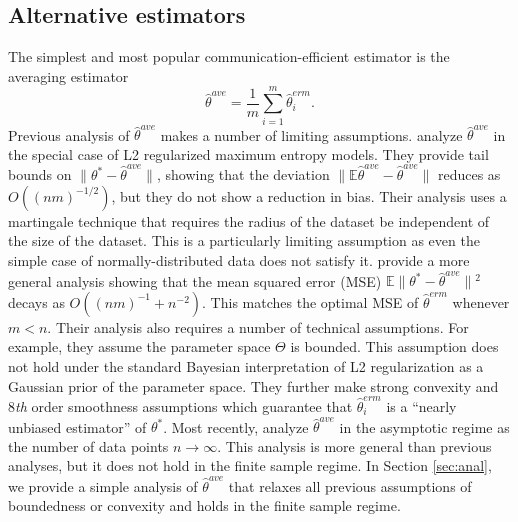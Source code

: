 \documentclass[twoside]{article}
\newcommand{\E}{\mathbb{E}}
\newcommand{\w}{\theta}
\newcommand{\wave}{\hat\w^{ave}}
\newcommand{\wmle}{\hat\w^{erm}}
\newcommand{\wstar}{{\w^{*}}}
\newcommand{\ltwo}[1]{{\lVert {#1} \rVert}}
\begin{document}
\subsection{Alternative estimators}
\label{sec:alt}
The simplest and most popular communication-efficient estimator is the averaging estimator
\begin{equation}
\wave = \frac{1}{m}\sum_{i=1}^m \wmle_i
.
\end{equation}
Previous analysis of $\wave$ makes a number of limiting assumptions.
\citet{mcdonald2009efficient} analyze $\wave$ in the special case of L2 regularized maximum entropy models.
They provide tail bounds on $\ltwo{\wstar-\wave}$, 
showing that the deviation $\ltwo{\E\wave-\wave}$ reduces as $O((nm)^{-1/2})$,
but they do not show a reduction in bias.
Their analysis uses a martingale technique that requires the radius of the dataset be independent of the size of the dataset.
This is a particularly limiting assumption as even the simple case of
normally-distributed data does not satisfy it.
\citet{zhang2012communication} provide a more general analysis showing that the mean squared error (MSE) $\E\ltwo{\wstar-\wave}{}^2$ decays as $O((nm)^{-1} + n^{-2})$.
This matches the optimal MSE of $\wmle$ whenever $m<n$.
Their analysis also requires a number of technical assumptions.
For example, they assume the parameter space $\Theta$ is bounded.
This assumption does not hold under the standard Bayesian interpretation of L2 regularization as a Gaussian prior of the parameter space.
They further make strong convexity and 8\emph{th} order smoothness assumptions which guarantee that $\wmle_i$ is a ``nearly unbiased estimator'' of $\wstar$.
Most recently, \citet{rosenblatt2016optimality} analyze $\wave$ in the asymptotic regime as the number of data points $n\to\infty$.
This analysis is more general than previous analyses, but it does not hold in the finite sample regime.
In Section \ref{sec:anal}, we provide a simple analysis of $\wave$ that relaxes all previous assumptions of boundedness or convexity and holds in the finite sample regime.
\end{document}
